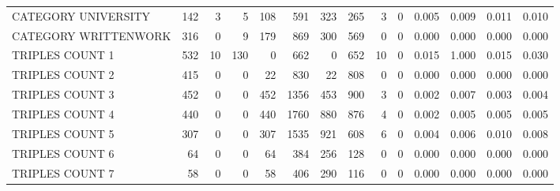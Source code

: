 \begin{tabular}{lrrrrrrrrrllll}
 CATEGORY UNIVERSITY      &             142 &             3 &               5 &             108 &             591 &  323 &  265 &    3 &    0 & 0.005 & 0.009 & 0.011 & 0.010 \\
 CATEGORY WRITTENWORK     &             316 &             0 &               9 &             179 &             869 &  300 &  569 &    0 &    0 & 0.000 & 0.000 & 0.000 & 0.000 \\
 TRIPLES COUNT 1          &             532 &            10 &             130 &               0 &             662 &    0 &  652 &   10 &    0 & 0.015 & 1.000 & 0.015 & 0.030 \\
 TRIPLES COUNT 2          &             415 &             0 &               0 &              22 &             830 &   22 &  808 &    0 &    0 & 0.000 & 0.000 & 0.000 & 0.000 \\
 TRIPLES COUNT 3          &             452 &             0 &               0 &             452 &            1356 &  453 &  900 &    3 &    0 & 0.002 & 0.007 & 0.003 & 0.004 \\
 TRIPLES COUNT 4          &             440 &             0 &               0 &             440 &            1760 &  880 &  876 &    4 &    0 & 0.002 & 0.005 & 0.005 & 0.005 \\
 TRIPLES COUNT 5          &             307 &             0 &               0 &             307 &            1535 &  921 &  608 &    6 &    0 & 0.004 & 0.006 & 0.010 & 0.008 \\
 TRIPLES COUNT 6          &              64 &             0 &               0 &              64 &             384 &  256 &  128 &    0 &    0 & 0.000 & 0.000 & 0.000 & 0.000 \\
 TRIPLES COUNT 7          &              58 &             0 &               0 &              58 &             406 &  290 &  116 &    0 &    0 & 0.000 & 0.000 & 0.000 & 0.000 \\
\hline
\end{tabular}